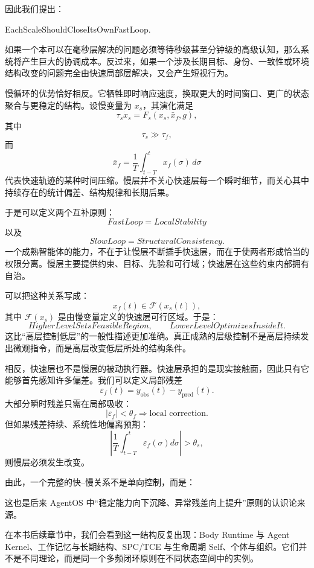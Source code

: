 因此我们提出：
\begin{statementbox}
EachScaleShouldCloseItsOwnFastLoop.
\end{statementbox}
如果一个本可以在毫秒层解决的问题必须等待秒级甚至分钟级的高级认知，那么系统将产生巨大的协调成本。反过来，如果一个涉及长期目标、身份、一致性或环境结构改变的问题完全由快速局部层解决，又会产生短视行为。

慢循环的优势恰好相反。它牺牲即时响应速度，换取更大的时间窗口、更广的状态聚合与更稳定的结构。设慢变量为 $x_s$，其演化满足
\[
\tau_s\dot{x}_s
=
F_s
\left(
x_s,
\bar{x}_f,
g
\right),
\]
其中
\[
\tau_s\gg\tau_f,
\]
而
\[
\bar{x}_f
=
\frac{1}{T}
\int_{t-T}^{t}
x_f(\sigma)\,d\sigma
\]
代表快速轨迹的某种时间压缩。慢层并不关心快速层每一个瞬时细节，而关心其中持续存在的统计偏差、结构规律和长期后果。

于是可以定义两个互补原则：
\[
\boxed{
FastLoop
=
LocalStability
}
\]
以及
\[
\boxed{
SlowLoop
=
StructuralConsistency.
}
\]
一个成熟智能体的能力，不在于让慢层不断插手快速层，而在于使两者形成恰当的权限分离。慢层主要提供约束、目标、先验和可行域；快速层在这些约束内部拥有自治。

可以把这种关系写成：
\[
x_f(t)
\in
\mathcal{F}
\left(
x_s(t)
\right),
\]
其中 $\mathcal{F}(x_s)$ 是由慢变量定义的快速层可行区域。于是：
\[
\boxed{
HigherLevelSetsFeasibleRegion,
\qquad
LowerLevelOptimizesInsideIt.
}
\]
这比“高层控制低层”的一般性描述更加准确。真正成熟的层级控制不是高层持续发出微观指令，而是高层改变低层所处的结构条件。

相反，快速层也不是慢层的被动执行器。快速层承担的是现实接触面，因此只有它能够首先感知许多偏差。我们可以定义局部残差
\[
\varepsilon_f(t)
=
y_{\mathrm{obs}}(t)
-
y_{\mathrm{pred}}(t).
\]
大部分瞬时残差只需在局部吸收：
\[
|\varepsilon_f|
<
\theta_f
\Rightarrow
\text{local correction}.
\]
但如果残差持续、系统性地偏离预期：
\[
\left|
\frac{1}{T}
\int_{t-T}^{t}
\varepsilon_f(\sigma)
d\sigma
\right|
>
\theta_s,
\]
则慢层必须发生改变。

由此，一个完整的快--慢关系不是单向控制，而是：
\begin{statementbox}
\centering
{}
\end{statementbox}
这也是后来 AgentOS 中“稳定能力向下沉降、异常残差向上提升”原则的认识论来源。

在本书后续章节中，我们会看到这一结构反复出现：Body Runtime 与 Agent Kernel、工作记忆与长期结构、SPC/TCE 与生命周期 Self、个体与组织。它们并不是不同理论，而是同一个多频闭环原则在不同状态空间中的实例。

